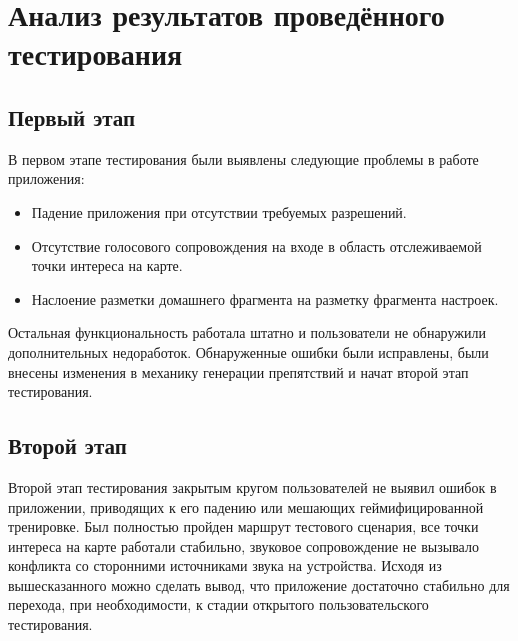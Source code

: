 \section{Анализ результатов проведённого тестирования}
\subsection*{Первый этап}
В первом этапе тестирования были выявлены следующие проблемы в работе приложения:
\begin{itemize}
	\item Падение приложения при отсутствии требуемых разрешений.
	\item Отсутствие голосового сопровождения на входе в область отслеживаемой точки интереса на карте.
	\item Наслоение разметки домашнего фрагмента на разметку фрагмента настроек.
\end{itemize}
\smallskip
Остальная функциональность работала штатно и пользователи не обнаружили дополнительных недоработок. Обнаруженные ошибки были исправлены, были внесены изменения в механику генерации препятствий и начат второй этап тестирования.

\subsection*{Второй этап}
Второй этап тестирования закрытым кругом пользователей не выявил ошибок в приложении, приводящих к его падению или мешающих геймифицированной тренировке.
Был полностью пройден маршрут тестового сценария, все точки интереса на карте работали стабильно, звуковое сопровождение не вызывало конфликта со сторонними источниками звука на устройства.
Исходя из вышесказанного можно сделать вывод, что приложение достаточно стабильно для перехода, при необходимости, к стадии открытого пользовательского тестирования.